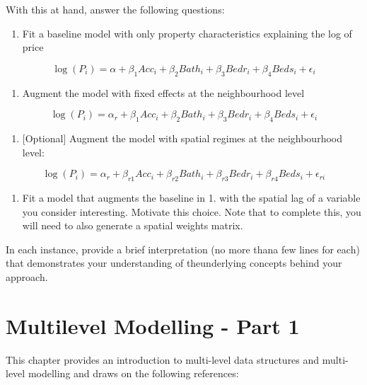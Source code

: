 \documentclass[
]{book}
\providecommand{\tightlist}{%
  \setlength{\itemsep}{0pt}\setlength{\parskip}{0pt}}
\begin{document}
With this at hand, answer the following questions:

\begin{enumerate}
\def\labelenumi{\arabic{enumi}.}
\tightlist
\item
  Fit a baseline model with only property characteristics explaining the log of price
\end{enumerate}

\[
\log(P_i) = \alpha + \beta_1 Acc_i + \beta_2 Bath_i + \beta_3 Bedr_i + \beta_4 Beds_i + \epsilon_i
\]

\begin{enumerate}
\def\labelenumi{\arabic{enumi}.}
\setcounter{enumi}{1}
\tightlist
\item
  Augment the model with fixed effects at the neighbourhood level
\end{enumerate}

\[
\log(P_i) = \alpha_r + \beta_1 Acc_i + \beta_2 Bath_i + \beta_3 Bedr_i + \beta_4 Beds_i + \epsilon_i
\]

\begin{enumerate}
\def\labelenumi{\arabic{enumi}.}
\setcounter{enumi}{2}
\tightlist
\item
  {[}Optional{]} Augment the model with spatial regimes at the neighbourhood level:
\end{enumerate}

\[
\log(P_i) = \alpha_r + \beta_{r1} Acc_i + \beta_{r2} Bath_i + \beta_{r3} Bedr_i + \beta_{r4} Beds_i + \epsilon_{ri}
\]

\begin{enumerate}
\def\labelenumi{\arabic{enumi}.}
\setcounter{enumi}{3}
\tightlist
\item
  Fit a model that augments the baseline in 1. with the spatial lag of a variable you consider interesting. Motivate this choice. Note that to complete this, you will need to also generate a spatial weights matrix.
\end{enumerate}

In each instance, provide a brief interpretation (no more thana few lines for each) that demonstrates your understanding of theunderlying concepts behind your approach.

\hypertarget{mlm1}{%
\chapter{Multilevel Modelling - Part 1}\label{mlm1}}

This chapter provides an introduction to multi-level data structures and multi-level modelling and draws on the following references:
\end{document}
